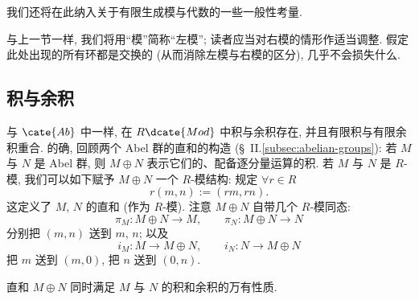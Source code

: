我们还将在此纳入关于有限生成模与代数的一些一般性考量.

与上一节一样, 我们将用``模''简称``左模''; 读者应当对右模的情形作适当调整. 假定此处出现的所有环都是交换的 (从而消除左模与右模的区分), 几乎不会损失什么.

\subsection{积与余积}
\label{subsec:mod-prod-coprod}

与 $\cate{Ab}$ 中一样, 在 $R\dcate{Mod}$ 中积与余积存在, 并且有限积与有限余积重合. 的确, 回顾两个 Abel 群的直和的构造 (\S~II.\ref{subsec:abelian-groups}): 若 $M$ 与 $N$ 是 Abel 群, 则 $M \oplus N$ 表示它们的、配备逐分量运算的积. 若 $M$ 与 $N$ 是 $R$-模, 我们可以如下赋予 $M \oplus N$ 一个 $R$-模结构: 规定 $\forall r \in R$
\[
r(m, n) := (rm, rn).
\]
这定义了 $M$, $N$ 的直和 (作为 $R$-模). 注意 $M \oplus N$ 自带几个 $R$-模同态:
\[
\pi_M : M \oplus N \to M, \qquad \pi_N : M \oplus N \to N
\]
分别把 $(m, n)$ 送到 $m$, $n$; 以及
\[
i_M : M \to M \oplus N, \qquad i_N : N \to M \oplus N
\]
把 $m$ 送到 $(m, 0)$, 把 $n$ 送到 $(0, n)$.

\begin{proposition}
\label{prop:mod-prod-coprod}
直和 $M \oplus N$ 同时满足 $M$ 与 $N$ 的积和余积的万有性质.
\end{proposition}

